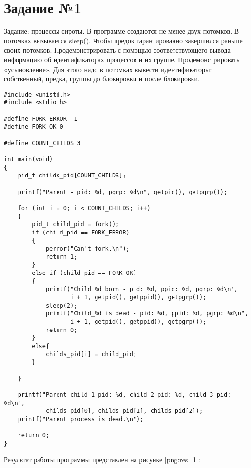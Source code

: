 \chapter*{Задание №1}
Задание: процессы-сироты. В программе создаются не менее двух потомков. В потомках вызывается sleep(). Чтобы предок гарантированно завершился раньше своих потомков. Продемонстрировать с помощью соответствующего вывода информацию об идентификаторах процессов и их группе. Продемонстрировать «усыновление». Для этого надо в потомках вывести идентификаторы: собственный, предка, группы до блокировки и после блокировки.

\begin{lstlisting}[label = ordinary_min, caption=Процессы-сироты.]
#include <unistd.h>
#include <stdio.h>

#define FORK_ERROR -1
#define FORK_OK 0

#define COUNT_CHILDS 3

int main(void)
{
	pid_t childs_pid[COUNT_CHILDS];
	
	printf("Parent - pid: %d, pgrp: %d\n", getpid(), getpgrp());
	
	for (int i = 0; i < COUNT_CHILDS; i++)
	{
		pid_t child_pid = fork();
		if (child_pid == FORK_ERROR)
		{
			perror("Can't fork.\n");
			return 1;
		}
		else if (child_pid == FORK_OK)
		{
			printf("Child_%d born - pid: %d, ppid: %d, pgrp: %d\n", 
			       i + 1, getpid(), getppid(), getpgrp());
			sleep(2);
			printf("Child_%d is dead - pid: %d, ppid: %d, pgrp: %d\n",
			       i + 1, getpid(), getppid(), getpgrp());
			return 0;
		}
		else{
			childs_pid[i] = child_pid;
		}
		
	}
	
	printf("Parent-child_1_pid: %d, child_2_pid: %d, child_3_pid: %d\n", 
	        childs_pid[0], childs_pid[1], childs_pid[2]);
	printf("Parent process is dead.\n");
	
	return 0;
}
\end{lstlisting}


Результат работы программы представлен на рисунке \ref{png:res_1}:

\begin{figure}[H]
\end{figure}